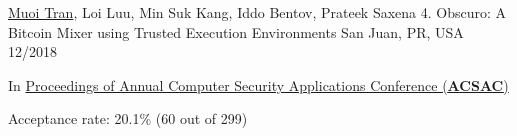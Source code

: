 \begin{cventries}
  \cventry
    {\underline{Muoi Tran}, Loi Luu, Min Suk Kang, Iddo Bentov, Prateek Saxena } %
    {4. Obscuro: A Bitcoin Mixer using Trusted Execution Environments} %
    {San Juan, PR, USA}
    {12/2018} %
    {
      \begin{cvitems} %
        \item {In \href{https://www.acsac.org/2018/}{Proceedings of Annual Computer Security Applications Conference (\textbf{ACSAC})}}
        \item {Acceptance rate: 20.1\% (60 out of 299)}
      \end{cvitems}
    }



\end{cventries}








